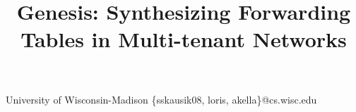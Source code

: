 \documentclass[9pt,numbers]{sigplanconf}
\begin{document}
\toappear{}
%



\title{Genesis: Synthesizing Forwarding Tables in Multi-tenant Networks}
{University of Wisconsin-Madison}
{\{sskausik08, loris, akella\}@cs.wisc.edu}
\maketitle















%
%


%






\end{document}
